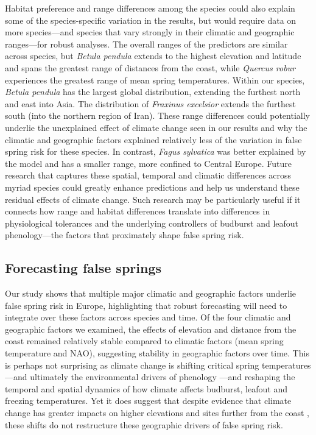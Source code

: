 \documentclass{article}\usepackage[]{graphicx}\usepackage[]{color}
\begin{document}
Habitat preference and range differences among the species could also explain some of the species-specific variation in the results, but would require data on more species---and species that vary strongly in their climatic and geographic ranges---for robust analyses. The overall ranges of the predictors are similar across species, but \textit{Betula pendula} extends to the highest elevation and latitude and spans the greatest range of distances from the coast, while \textit{Quercus robur} experiences the greatest range of mean spring temperatures. Within our species, \textit{Betula pendula} has the largest global distribution, extending the furthest north and east into Asia. The distribution of \textit{Fraxinus excelsior} extends the furthest south (into the northern region of Iran). These range differences could potentially underlie the unexplained effect of climate change seen in our results and why the climatic and geographic factors explained relatively less of the variation in false spring risk for these species. In contrast, \textit{Fagus sylvatica} was better explained by the model and has a smaller range, more confined to Central Europe. Future research that captures these spatial, temporal and climatic differences across myriad species could greatly enhance predictions and help us understand these residual effects of climate change. Such research may be particularly useful if it connects how range and habitat differences translate into differences in physiological tolerances and the underlying controllers of budburst and leafout phenology---the factors that proximately shape false spring risk. 

\subsection*{Forecasting false springs}
Our study shows that multiple major climatic and geographic factors underlie false spring risk in Europe, highlighting that robust forecasting will need to integrate over these factors across species and time. Of the four climatic and geographic factors we examined, the effects of elevation and distance from the coast remained relatively stable compared to climatic factors (mean spring temperature and NAO), suggesting stability in geographic factors over time. This is perhaps not surprising as climate change is shifting critical spring temperatures---and ultimately the environmental drivers of phenology \citep{Gauzere2019}---and reshaping the temporal and spatial dynamics of how climate affects budburst, leafout and freezing temperatures.  Yet it does suggest that despite evidence that climate change has greater impacts on higher elevations and sites further from the coast \citep{Giorgi1997,Rangwala2012,Pepin2015,Vitasse2018}, these shifts do not restructure these geographic drivers of false spring risk.  
\end{document}
